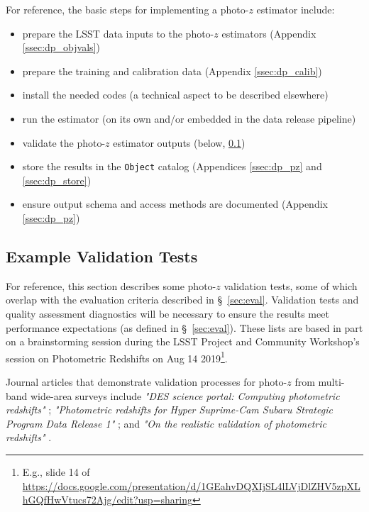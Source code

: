 \documentclass[DM,authoryear,toc]{lsstdoc}
\begin{document}
For reference, the basic steps for implementing a photo-$z$ estimator include:
\vspace{-15pt}
\begin{itemize}
\item prepare the LSST data inputs to the photo-$z$ estimators (Appendix \ref{ssec:dp_objvals})
\item prepare the training and calibration data (Appendix \ref{ssec:dp_calib})
\item install the needed codes (a technical aspect to be described elsewhere)
\item run the estimator (on its own and/or embedded in the data release pipeline)
\item validate the photo-$z$ estimator outputs (below, \ref{ssec:imp_val})
\item store the results in the {\tt Object} catalog (Appendices \ref{ssec:dp_pz} and \ref{ssec:dp_store})
\item ensure output schema and access methods are documented (Appendix \ref{ssec:dp_pz})
\end{itemize}

\subsection{Example Validation Tests}\label{ssec:imp_val}

For reference, this section describes some photo-$z$ validation tests, some of which overlap with the evaluation criteria described in \S~\ref{sec:eval}. 
Validation tests and quality assessment diagnostics will be necessary to ensure the results meet performance expectations (as defined in \S~\ref{sec:eval}).
These lists are based in part on a brainstorming session during the LSST Project and Community Workshop's session on Photometric Redshifts on Aug 14 2019\footnote{E.g., slide 14 of \url{https://docs.google.com/presentation/d/1GEahvDQXIjSL4lLVjDlZHV5zpXLhGQfHwVtucs72Ajg/edit?usp=sharing}}.

Journal articles that demonstrate validation processes for photo-$z$ from multi-band wide-area surveys include {\it "DES science portal: Computing photometric redshifts"} \citep{2018A&C....25...58G}; {\it "Photometric redshifts for Hyper Suprime-Cam Subaru Strategic Program Data Release 1"} \citep{2018PASJ...70S...9T}; and {\it "On the realistic validation of photometric redshifts"} \citep{2017MNRAS.468.4323B}. 
\end{document}
